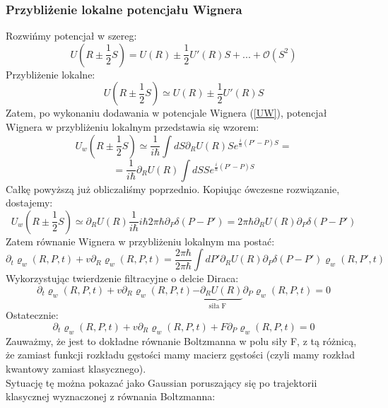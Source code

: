 \subsubsection{Przybliżenie lokalne potencjału Wignera}
Rozwińmy potencjał w szereg:
\begin{equation}U(R\pm\frac{1}{2}S)=U(R)\pm \frac{1}{2}U'(R)S+...+\mathcal{O}(S^2)
\end{equation}
Przybliżenie lokalne:
\begin{equation}U(R\pm\frac{1}{2}S)\simeq U(R)\pm \frac{1}{2}U'(R)S
\end{equation}
Zatem, po wykonaniu dodawania w potencjale Wignera (\ref{UW}), potencjał Wignera w przybliżeniu lokalnym przedstawia się wzorem:
\begin{equation}
U_w(R\pm\frac{1}{2}S)\simeq
\frac{1}{i\hbar}\int dS \partial_R U(R) Se^{\frac{i}{\hbar}(P'-P)S}=\nonumber
\end{equation}
\begin{equation}
=\frac{1}{i\hbar}\partial_R U(R)\int dS Se^{\frac{i}{\hbar}(P'-P)S}
\end{equation}
Całkę powyższą już obliczaliśmy poprzednio. Kopiując ówczesne rozwiązanie, dostajemy:
\begin{equation}
U_w(R\pm\frac{1}{2}S)\simeq \partial_R U(R)\frac{1}{i\hbar}i\hbar 2\pi\hbar \partial_P \delta(P-P')=2\pi\hbar\partial_R U(R) \partial_P \delta(P-P')
\end{equation}
Zatem równanie Wignera w przybliżeniu lokalnym ma postać:
\begin{equation}
\partial_t\varrho_w(R,P,t)+
v\partial_R \varrho_w(R,P,t)=
\frac{2\pi\hbar}{2\pi\hbar}\int dP' \partial_R U(R) \partial_P \delta(P-P')\varrho_w(R,P',t)
\end{equation}
Wykorzystując twierdzenie filtracyjne o delcie Diraca:
\begin{equation}
\partial_t\varrho_w(R,P,t)+
v\partial_R \varrho_w(R,P,t)\underbrace{-
 \partial_R U(R)}_{\text{siła F}} \partial_P \varrho_w(R,P,t)=0
\end{equation}
Ostatecznie:
\begin{equation}
\partial_t\varrho_w(R,P,t)+
v\partial_R \varrho_w(R,P,t)+F \partial_P \varrho_w(R,P,t)=0
 \end{equation}
 Zauważmy, że jest to dokładne równanie Boltzmanna w polu siły F, z tą różnicą, że zamiast funkcji rozkładu gęstości mamy macierz gęstości (czyli mamy rozkład kwantowy zamiast klasycznego).\\
Sytuację tę można pokazać jako Gaussian poruszający się po trajektorii klasycznej wyznaczonej z równania Boltzmanna:
